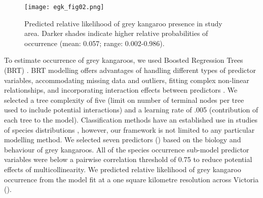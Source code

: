 \begin{figure*}[htp]
  \centering
  \texttt{[image: egk\_fig02.png]}
  \caption[Predicted relative likelihood of grey kangaroo occurrence in Victoria]{Predicted relative likelihood of grey kangaroo presence in study area. Darker shades indicate higher relative probabilities of occurrence (mean: 0.057; range: 0.002-0.986).}
  \label{egk_occmap}
\end{figure*}

To estimate occurrence of grey kangaroos, we used Boosted Regression Trees (BRT) \citep{frie02}. BRT modelling offers advantages of handling different types of predictor variables, accommodating missing data and outliers, fitting complex non-linear relationships, and incorporating interaction effects between predictors \citep{elit08}. We selected a tree complexity of five (limit on number of terminal nodes per tree used to include potential interactions) and a learning rate of .005 (contribution of each tree to the model). Classification methods have an established use in studies of species distributions \citep{walk90,skid96}, however, our framework is not limited to any particular modelling method. We selected seven predictors () based on the biology and behaviour of grey kangaroos. All of the species occurrence sub-model predictor variables were below a pairwise correlation threshold of 0.75 to reduce potential effects of multicollinearity. We predicted relative likelihood of grey kangaroo occurrence from the model fit at a one square kilometre resolution across Victoria ().

